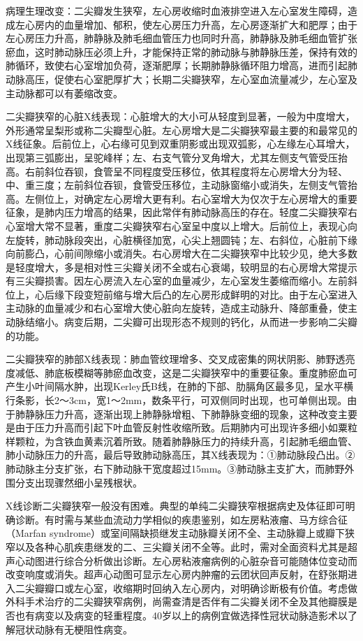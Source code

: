 病理生理改变：二尖瓣发生狭窄，左心房收缩时血液排空进入左心室发生障碍，造成左心房内的血量增加、郁积，使左心房压力升高，左心房逐渐扩大和肥厚；由于左心房压力升高，肺静脉及肺毛细血管压力也同时升高，肺静脉及肺毛细血管扩张瘀血，这时肺动脉压必须上升，才能保持正常的肺动脉与肺静脉压差，保持有效的肺循环，致使右心室增加负荷，逐渐肥厚；长期肺静脉循环阻力增高，进而引起肺动脉高压，促使右心室肥厚扩大；长期二尖瓣狭窄，左心室血流量减少，左心室及主动脉都可以有萎缩改变。

二尖瓣狭窄的心脏X线表现：心脏增大的大小可从轻度到显著，一般为中度增大，外形通常呈梨形或称二尖瓣型心脏。左心房增大是二尖瓣狭窄最主要的和最常见的X线征象。后前位上，心右缘可见到双重阴影或出现双弧影，心左缘左心耳增大，出现第三弧膨出，呈驼峰样；左、右支气管分叉角增大，尤其左侧支气管受压抬高。右前斜位吞钡，食管呈不同程度受压移位，依其程度将左心房增大分为轻、中、重三度；左前斜位吞钡，食管受压移位，主动脉窗缩小或消失，左侧支气管抬高。左侧位上，对确定左心房增大更有利。右心室增大为仅次于左心房增大的重要征象，是肺内压力增高的结果，因此常伴有肺动脉高压的存在。轻度二尖瓣狭窄右心室增大常不显著，重度二尖瓣狭窄右心室呈中度以上增大。后前位上，表现心向左旋转，肺动脉段突出，心脏横径加宽，心尖上翘圆钝；左、右斜位，心脏前下缘向前膨凸，心前间隙缩小或消失。右心房增大在二尖瓣狭窄中比较少见，绝大多数是轻度增大，多是相对性三尖瓣关闭不全或右心衰竭，较明显的右心房增大常提示有三尖瓣损害。因左心房流入左心室的血量减少，左心室发生萎缩而缩小。左前斜位上，心后缘下段变短前缩与增大后凸的左心房形成鲜明的对比。由于左心室进入主动脉的血量减少和右心室增大使心脏向左旋转，造成主动脉升、降部重叠，使主动脉结缩小。病变后期，二尖瓣可出现形态不规则的钙化，从而进一步影响二尖瓣的功能。

二尖瓣狭窄的肺部X线表现：肺血管纹理增多、交叉成密集的网状阴影、肺野透亮度减低、肺底板模糊等肺瘀血改变，这是二尖瓣狭窄中的重要征象。重度肺瘀血可产生小叶间隔水肿，出现Kerley氏B线，在肺的下部、肋膈角区最多见，呈水平横行条影，长2～3cm，宽1～2mm，数条平行，可双侧同时出现，也可单侧出现。由于肺静脉压力升高，逐渐出现上肺静脉增粗、下肺静脉变细的现象，这种改变主要是由于压力升高而引起下叶血管反射性收缩所致。后期肺内可出现许多细小如粟粒样颗粒，为含铁血黄素沉着所致。随着肺静脉压力的持续升高，引起肺毛细血管、肺小动脉压力的升高，最后导致肺动脉高压，其X线表现为：①肺动脉段凸出。②肺动脉主分支扩张，右下肺动脉干宽度超过15mm。③肺动脉主支扩大，而肺野外围分支出现骤然细小呈残根状。

X线诊断二尖瓣狭窄一般没有困难。典型的单纯二尖瓣狭窄根据病史及体征即可明确诊断。有时需与某些血流动力学相似的疾患鉴别，如左房粘液瘤、马方综合征（Marfan
syndrome）或室间隔缺损继发主动脉瓣关闭不全、主动脉瓣上或瓣下狭窄以及各种心肌疾患继发的二、三尖瓣关闭不全等。此时，需对全面资料尤其是超声心动图进行综合分析做出诊断。左心房粘液瘤病例的心脏杂音可能随体位变动而改变响度或消失。超声心动图可显示左心房内肿瘤的云团状回声反射，在舒张期进入二尖瓣瓣口或左心室，收缩期时回纳入左心房内，对明确诊断极有价值。考虑做外科手术治疗的二尖瓣狭窄病例，尚需查清是否伴有二尖瓣关闭不全及其他瓣膜是否也有病变以及病变的轻重程度。40岁以上的病例宜做选择性冠状动脉造影术以了解冠状动脉有无梗阻性病变。

